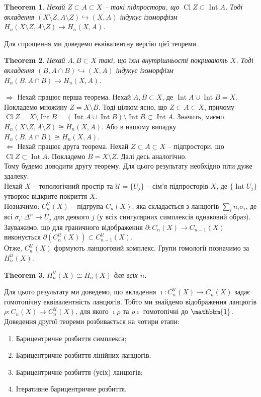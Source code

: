 \documentclass[a4paper, 10pt]{article}
\def\rightproof{$\boxed{\Rightarrow}$ }
\def\leftproof{$\boxed{\Leftarrow}$ }
\theoremstyle{theoremdd}
\newtheorem{theorem}{Theorem}[subsection]
\theoremstyle{theoremdd}
\theoremstyle{theoremdd}
\theoremstyle{theoremdd}
\theoremstyle{theoremdd}
\theoremstyle{theoremdd}
\theoremstyle{theoremdd}
\theoremstyle{theoremdd}
\theoremstyle{theoremdd}
\theoremstyle{theoremdd}
\theoremstyle{theoremdd}
\theoremstyle{theoremdd}
\theoremstyle{theoremdd}
\theoremstyle{theoremdd}
\theoremstyle{theoremdd}
\DeclareMathOperator{\Cl}{Cl}
\DeclareMathOperator{\Int}{Int}
\begin{document}
\begin{theorem}
Нехай $Z \subset A \subset X$ -- такі підпростори, що $\Cl Z \subset \Int A$. Тоді вкладення $(X \setminus Z, A \setminus Z) \hookrightarrow (X,A)$ індукує ізоморфізм $H_n(X \setminus Z, A \setminus Z) \to H_n(X,A)$. 
\end{theorem}

Для спрощення ми доведемо еквівалентну версію цієї теореми.
\begin{theorem}
Нехай $A,B \subset X$ такі, що їхні внутрішньості покривають $X$. Тоді вкладення $(B, A \cap B) \hookrightarrow (X,A)$ індукує ізоморфізм $H_n(B, A \cap B) \to H_n(X,A)$.
\end{theorem}

\rightproof Нехай працює перша теорема. Нехай $A,B \subset X$, де $\Int A \cup \Int B = X$. Покладемо множину $Z = X \setminus B$. Тоді цілком ясно, що $Z \subset A \subset X$, причому $\Cl Z = X \setminus \Int B = (\Int A \cup \Int B) \setminus \Int B \subset \Int A$. Значить, маємо $H_n(X \setminus Z, A \setminus Z) \cong H_n(X,A)$. Або в нашому випадку $H_n(B, A \cap B) \cong H_n(X,A)$.\\
\leftproof Нехай працює друга теорема. Нехай $Z \subset A \subset X$ -- підпростори, що $\Cl Z \subset \Int A$. Покладемо $B = X \setminus Z$. Далі десь аналогічно.
\bigskip \\
Тому будемо доводити другу теорему. Для цього результату необхідно піти дуже здалеку.
\bigskip \\
Нехай $X$ -- топологічний простір та $\mathcal{U} = \{U_j\}$ -- сім'я підпросторів $X$, де $\{\Int U_j\}$ утворює відкрите покриття $X$.\\
Позначимо: $C_n^\mathcal{U}(X)$ -- підгрупа $C_n(X)$, яка складається з ланцюгів $\displaystyle\sum_i n_i \sigma_i$, де всі $\sigma_i \colon \Delta^n \to U_j$ для деякого $j$ (у всіх сингулярних симплексів однаковий образ). Зауважимо, що для граничного відображення $\partial \colon C_n(X) \to C_{n-1}(X)$ виконується $\partial(C_n^\mathcal{U}(X)) \subset C_{n-1}^{\mathcal{U}}(X)$.\\
Отже, $C_n^\mathcal{U}(X)$ формують ланцюговий комплекс. Групи гомології позначимо за $H_n^\mathcal{U}(X)$.

\begin{theorem}
$H_n^\mathcal{U}(X) \cong H_n(X)$ для всіх $n$.
\end{theorem}
Для цього результату ми доведемо, що вкладення $\imath \colon C_n^\mathcal{U}(X) \to C_n(X)$ задає гомотопічну еквівалентність ланцюгів. Тобто ми знайдемо відображення ланцюгів $\rho \colon C_n(X) \to C_n^\mathcal{U}(X)$, для якого $\imath \rho$ та $\rho \imath$ гомотопічні до $\mathbbm{1}$.
\bigskip \\
Доведення другої теореми розбивається на чотири етапи:
\begin{enumerate}[nosep,wide=0pt]
\item Барицентричне розбиття симплекса;
\item Барицентричне розбиття лінійних ланцюгів;
\item Барицентричне розбиття (усіх) ланцюгів;
\item Ітеративне барицентричне розбиття.
\end{enumerate}
\end{document}

